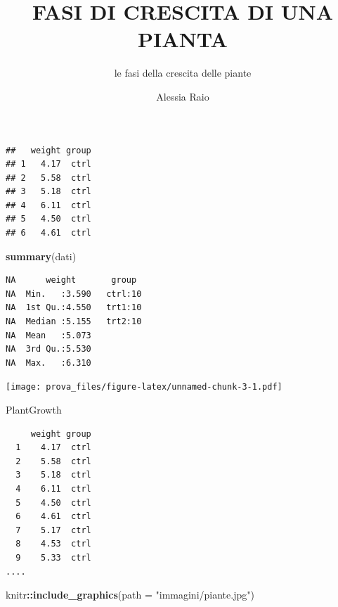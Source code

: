 \documentclass[
]{article}
\title{FASI DI CRESCITA DI UNA PIANTA}
\subtitle{le fasi della crescita delle piante}
\author{Alessia Raio}
\date{}
\newenvironment{Shaded}{\begin{snugshade}}{\end{snugshade}}
\newcommand{\AttributeTok}[1]{\textcolor[rgb]{0.13,0.29,0.53}{#1}}
\newcommand{\FunctionTok}[1]{\textcolor[rgb]{0.13,0.29,0.53}{\textbf{#1}}}
\newcommand{\NormalTok}[1]{#1}
\newcommand{\SpecialCharTok}[1]{\textcolor[rgb]{0.81,0.36,0.00}{\textbf{#1}}}
\newcommand{\StringTok}[1]{\textcolor[rgb]{0.31,0.60,0.02}{#1}}
\begin{document}
\maketitle

{
\setcounter{tocdepth}{3}
\tableofcontents
}
\begin{verbatim}
##   weight group
## 1   4.17  ctrl
## 2   5.58  ctrl
## 3   5.18  ctrl
## 4   6.11  ctrl
## 5   4.50  ctrl
## 6   4.61  ctrl
\end{verbatim}

\begin{Shaded}
\begin{Highlighting}[]
\FunctionTok{summary}\NormalTok{(dati)}
\end{Highlighting}
\end{Shaded}

\begin{verbatim}
NA      weight       group   
NA  Min.   :3.590   ctrl:10  
NA  1st Qu.:4.550   trt1:10  
NA  Median :5.155   trt2:10  
NA  Mean   :5.073            
NA  3rd Qu.:5.530            
NA  Max.   :6.310
\end{verbatim}

\texttt{[image: prova\_files/figure-latex/unnamed-chunk-3-1.pdf]}

\begin{Shaded}
\end{Shaded}

\begin{Shaded}
\begin{Highlighting}[]
\NormalTok{PlantGrowth}
\end{Highlighting}
\end{Shaded}

\begin{verbatim}
     weight group
  1    4.17  ctrl
  2    5.58  ctrl
  3    5.18  ctrl
  4    6.11  ctrl
  5    4.50  ctrl
  6    4.61  ctrl
  7    5.17  ctrl
  8    4.53  ctrl
  9    5.33  ctrl
....
\end{verbatim}

\begin{Shaded}
\begin{Highlighting}[]
\NormalTok{knitr}\SpecialCharTok{::}\FunctionTok{include\_graphics}\NormalTok{(}\AttributeTok{path =} \StringTok{"immagini/piante.jpg"}\NormalTok{)}
\end{Highlighting}
\end{Shaded}
\end{document}
